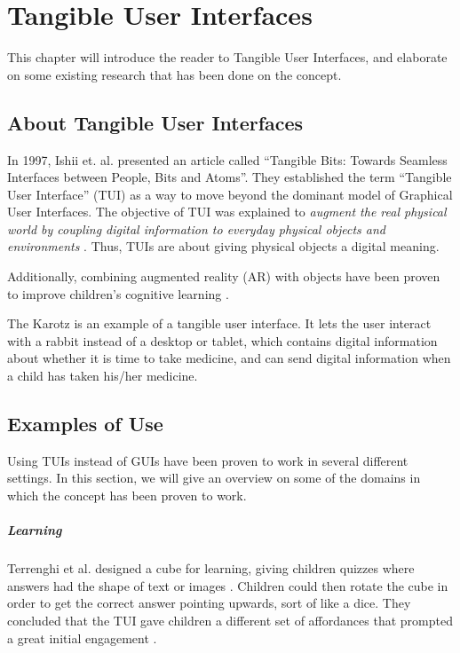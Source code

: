 \chapter{Tangible User Interfaces}
\label{chp:tangibleinterfaces}

This chapter will introduce the reader to Tangible User Interfaces, and elaborate on some existing research that has been done on the concept.   

\section{About Tangible User Interfaces}

In 1997, Ishii et. al. presented an article called ``Tangible Bits: Towards Seamless Interfaces between People, Bits and Atoms''. They established the term ``Tangible User Interface'' (TUI) as a way to move beyond the dominant model of Graphical User Interfaces. The objective of TUI was explained to \emph{augment the real physical world by coupling digital information to everyday physical objects and environments} \cite{ishii1997tangible}. Thus, TUIs are about giving physical objects a digital meaning. 

Additionally, combining augmented reality (AR) with objects have been proven to improve children's cognitive learning \cite{zhou2004magic}.   

The Karotz is an example of a tangible user interface. It lets the user interact with a rabbit instead of a desktop or tablet, which contains digital information about whether it is time to take medicine, and can send digital information when a child has taken his/her medicine.      


\section{Examples of Use}
Using TUIs instead of GUIs have been proven to work in several different settings. In this section, we will give an overview on some of the domains in which the concept has been proven to work. 

\paragraph{Learning}
Terrenghi et al. designed a cube for learning, giving children quizzes where answers had the shape of text or images \cite{terrenghi2006cube}. Children could then rotate the cube in order to get the correct answer pointing upwards, sort of like a dice. They concluded that the TUI gave children a different set of affordances that prompted a great initial engagement \cite{terrenghi2006cube}. 

